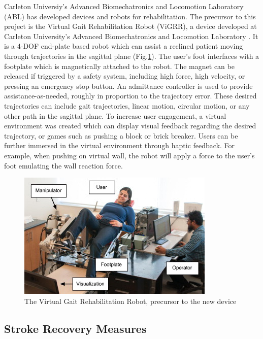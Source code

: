 \documentclass[12pt]{report}
\begin{document}
	Carleton Universiy's Advanced Biomechatronics and Locomotion Laboratory (ABL) has developed devices and robots for rehabilitation. The precursor to this project is the Virtual Gait Rehabilitation Robot (ViGRR), a device developed at Carleton University's Advanced Biomechatronics and Locomotion Laboratory \cite{Chisholm2014, Chisholm2010}. It is a 4-DOF end-plate based robot which can assist a reclined patient moving through trajectories in the sagittal plane (Fig.\ref{fig:vigrr}). The user's foot interfaces with a footplate which is magnetically attached to the robot. The magnet can be released if triggered by a safety system, including high force, high velocity, or pressing an emergency stop button. An admittance controller is used to provide assistance-as-needed, roughly in proportion to the trajectory error. These desired trajectories can include gait trajectories, linear motion, circular motion, or any other path in the sagittal plane. To increase user engagement, a virtual environment was created which can display visual feedback regarding the desired trajectory, or games such as pushing a block or brick breaker. Users can be further immersed in the virtual environment through haptic feedback. For example, when pushing on virtual wall, the robot will apply a force to the user's foot emulating the wall reaction force. 
	
	
	\begin{figure}[t] 
		\centering
		\includegraphics[width=0.75\linewidth]{Vigrr}
		\caption{The Virtual Gait Rehabilitation Robot, precursor to the new device}
		\label{fig:vigrr}
	\end{figure}	
	
	

	\subsection{Stroke Recovery Measures}
	
\end{document}
